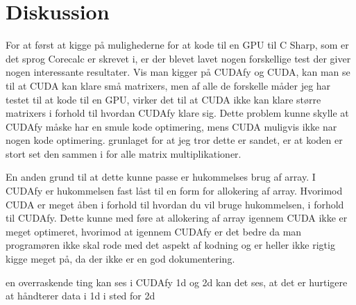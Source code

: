 \section{Diskussion}
For at først at kigge på mulighederne for at kode til en GPU til C Sharp, som er det sprog Corecalc er skrevet i, er der blevet lavet nogen forskellige test der giver nogen interessante resultater. Vis man kigger på CUDAfy og CUDA, kan man se til at CUDA kan klare små matrixers, men af alle de forskelle måder jeg har testet til at kode til en GPU, virker det til at CUDA ikke kan klare større matrixers i forhold til hvordan CUDAfy klare sig. Dette problem kunne skylle at CUDAfy måske har en smule kode optimering, mens CUDA muligvis ikke nar nogen kode optimering. grunlaget for at jeg tror dette er sandet, er at koden er stort set den sammen i for alle matrix multiplikationer.

En anden grund til at dette kunne passe er hukommelses brug af array. I CUDAfy er hukommelsen fast låst til en form for allokering af array. Hvorimod CUDA er meget åben i forhold til hvordan du vil bruge hukommelsen, i forhold til CUDAfy. Dette kunne med føre at allokering af array igennem CUDA ikke er meget optimeret, hvorimod at igennem CUDAfy er det bedre da man programøren ikke skal rode med det aspekt af kodning og er heller ikke rigtig kigge meget på, da der ikke er en god dokumentering.

en overraskende ting kan ses i CUDAfy 1d og 2d kan det ses, at det er hurtigere at håndterer data i 1d i sted for 2d